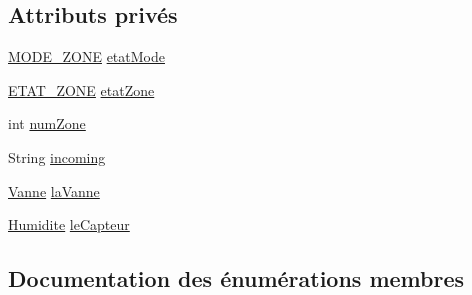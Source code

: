 \subsection*{Attributs privés}
\begin{DoxyCompactItemize}
\item 
\hyperlink{class_zone_a07d053965fa6722cfc3f80d225677497}{M\+O\+D\+E\+\_\+\+Z\+O\+NE} \hyperlink{class_zone_aa5e3a0305eda31639e37736109b7c957}{etat\+Mode}
\item 
\hyperlink{class_zone_afed66edb8ab1446dcab5186028648880}{E\+T\+A\+T\+\_\+\+Z\+O\+NE} \hyperlink{class_zone_a6130d56057619acb91ecce2a465b3b20}{etat\+Zone}
\item 
int \hyperlink{class_zone_a0efa38f2d12ae4d9ffcbffdee9b4f438}{num\+Zone}
\item 
String \hyperlink{class_zone_ac4e36c704602ec1d06d90a1f2c62b8be}{incoming}
\item 
\hyperlink{class_vanne}{Vanne} \hyperlink{class_zone_a375ebd280cc5bd60ba3e76a36224bc44}{la\+Vanne}
\item 
\hyperlink{class_humidite}{Humidite} \hyperlink{class_zone_a1f070429b7b55eb43aed46664f64f469}{le\+Capteur}
\end{DoxyCompactItemize}


\subsection{Documentation des énumérations membres}
